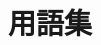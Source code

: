 \documentclass[dvipdfmx]{ampbt}
\begin{document}




\clearpage
\appendix

\section{用語集}

\printglossaries


\fi
\ifoutputcover
\evenclearpage
\makecover                      %
\makespine[1]                   %
\makeinsidecover                %
\fi
\ifoutputabstractforsubmission
\makeabstractforsubmission      %
\fi
\end{document}
